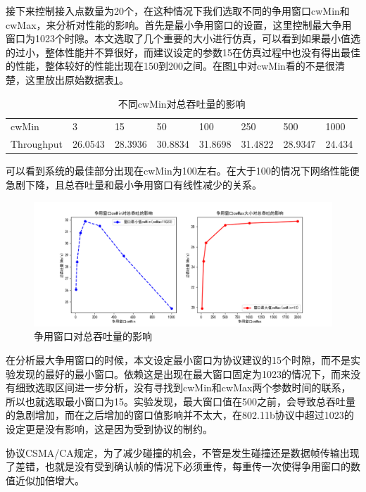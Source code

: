 \documentclass{article}
\begin{document}
接下来控制接入点数量为20个，在这种情况下我们选取不同的争用窗口cwMin和cwMax，来分析对性能的影响。首先是最小争用窗口的设置，这里控制最大争用窗口为1023个时隙。本文选取了几个重要的大小进行仿真，可以看到如果最小值选的过小，整体性能并不算很好，而建议设定的参数15在仿真过程中也没有得出最佳的性能，整体较好的性能出现在150到200之间。在图\ref{fig:cwMin_Max}中对cwMin看的不是很清楚，这里放出原始数据表\ref{tab:cwMin}。

\begin{table}[]
	\centering
	\begin{tabular}{llllllll}
		cwMin      & 3       & 15      & 50      & 100     & 250     & 500     & 1000   \\
		Throughput & 26.0543 & 28.3936 & 30.8834 & 31.8698 & 31.4822 & 28.9347 & 24.434
	\end{tabular}
	\caption{不同cwMin对总吞吐量的影响}
	\label{tab:cwMin}
\end{table}

可以看到系统的最佳部分出现在cwMin为100左右。在大于100的情况下网络性能便急剧下降，且总吞吐量和最小争用窗口有线性减少的关系。

\begin{figure}[ht]
	\centering
	\includegraphics[scale=0.6]{picture/cwMin_Max.png}
	\caption{争用窗口对总吞吐量的影响}
	\label{fig:cwMin_Max}
\end{figure}

在分析最大争用窗口的时候，本文设定最小窗口为协议建议的15个时隙，而不是实验发现的最好的最小窗口。依赖这是出现在最大窗口固定为1023的情况下，而来没有细致选取区间进一步分析，没有寻找到cwMin和cwMax两个参数时间的联系，所以也就选取最小窗口为15。实验发现，最大窗口值在500之前，会导致总吞吐量的急剧增加，而在之后增加的窗口值影响并不太大，在802.11b协议中超过1023的设定更是没有影响，这是因为受到协议的制约。

协议CSMA/CA规定，为了减少碰撞的机会，不管是发生碰撞还是数据帧传输出现了差错，也就是没有受到确认帧的情况下必须重传，每重传一次使得争用窗口的数值近似加倍增大。
\end{document}
